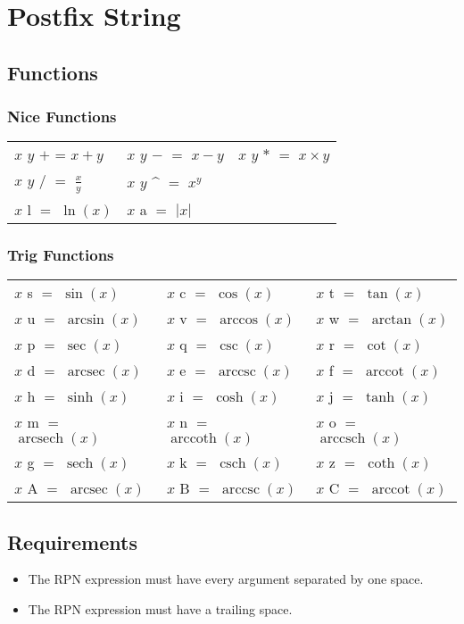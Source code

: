 \documentclass{article}
\DeclareMathOperator{\arcsec}{arcsec}
\DeclareMathOperator{\arccot}{arccot}
\DeclareMathOperator{\arccsc}{arccsc}
\DeclareMathOperator{\arcsinh}{arcsech}
\DeclareMathOperator{\arccosh}{arccoth}
\DeclareMathOperator{\arctanh}{arccsch}
\DeclareMathOperator{\sech}{sech}
\DeclareMathOperator{\csch}{csch}
\begin{document}
\section{Postfix String}
\subsection{Functions}
{\doublespacing
\subsubsection{Nice Functions}
\begin{tabular}{lll}
$x$ $y$ $+$ = $x + y$ & $x$ $y$ $-$ $=$ $x - y$ & $x$ $y$ $*$ $=$ $x \times y$\\
$x$ $y$ $/$ $=$ $\frac{x}{y}$&$x$ $y$ \^{} $=$ $x^y$&\\
$x$ l $=$ $\ln(x)$& $x$ a $=$ $|x|$&\\
\end{tabular}
\subsubsection{Trig Functions}
\begin{tabular}{lll}
$x$ s $=$ $\sin(x)$&$x$ c $=$ $\cos(x)$& $x$ t $=$ $\tan(x)$\\
$x$ u $=$ $\arcsin(x)$&$x$ v $=$ $\arccos(x)$& $x$ w $=$ $\arctan(x)$\\
$x$ p $=$ $\sec(x)$&$x$ q $=$ $\csc(x)$& $x$ r $=$ $\cot(x)$\\
$x$ d $=$ $\arcsec(x)$&$x$ e $=$ $\arccsc(x)$& $x$ f $=$ $\arccot(x)$\\
$x$ h $=$ $\sinh(x)$&$x$ i $=$ $\cosh(x)$& $x$ j $=$ $\tanh(x)$\\
$x$ m $=$ $\arcsinh(x)$&$x$ n $=$ $\arccosh(x)$& $x$ o $=$ $\arctanh(x)$\\
$x$ g $=$ $\sech(x)$&$x$ k $=$ $\csch(x)$& $x$ z $=$ $\coth(x)$\\
$x$ A $=$ $\arcsec(x)$&$x$ B $=$ $\arccsc(x)$& $x$ C $=$ $\arccot(x)$\\
\end{tabular}
}\subsection{Requirements}{
\begin{itemize}
\item{The RPN expression must have every argument separated by one space.}
\item{The RPN expression must have a trailing space.}
\end{itemize}
}
\end{document}

